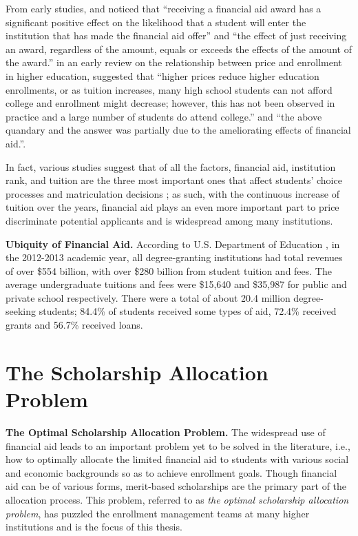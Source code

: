 \documentclass[12pt,english]{report}
\begin{document}
From early studies, \citet{Heller1997} and \citet{Leslie1988} noticed that ``receiving a financial aid award has a significant positive effect on the likelihood that a student will enter the institution that has made the financial aid offer'' and ``the effect of just receiving an award, regardless of the amount, equals or exceeds the effects of the amount of the award.'' \citep{Leslie1987} in an early review on the relationship between price and enrollment in higher education, suggested that ``higher prices reduce higher education enrollments, or as tuition increases, many high school students can not afford college and enrollment might decrease; however, this has not been observed in practice and a large number of students do attend college.'' and ``the above quandary and the answer was partially due to the ameliorating effects of financial aid.''.

In fact, various studies suggest that of all the factors, financial aid, institution rank, and tuition are the three most important ones that affect students' choice processes and matriculation decisions \citep{Fulleri2014}; as such, with the continuous increase of tuition over the years, financial aid plays an even more important part to price discriminate potential applicants and is widespread among many institutions.  

\noindent \textbf{Ubiquity of Financial Aid.} According to U.S. Department of  Education \citep{DOE2014}, in the 2012-2013 academic year, all degree-granting institutions had total revenues of over \$554 billion, with over \$280 billion from student tuition and fees. The average undergraduate tuitions and fees were \$15,640 and \$35,987 for public and private school respectively. There were a total of about 20.4 million degree-seeking students;  84.4\% of students received some types of aid, 72.4\% received grants and 56.7\% received loans.

\section{The Scholarship Allocation Problem} 
\noindent \textbf{The Optimal Scholarship Allocation Problem.} The widespread use of financial aid leads to an important problem yet to be solved in the literature, i.e., how to optimally allocate the limited financial aid to students with various social and economic backgrounds so as to achieve enrollment goals. Though financial aid can be of various forms, merit-based scholarships are the primary part of the allocation process. This problem, referred to as \textit{the optimal scholarship allocation problem}, has puzzled the enrollment management teams at many higher institutions and is the focus of this thesis.
\end{document}
